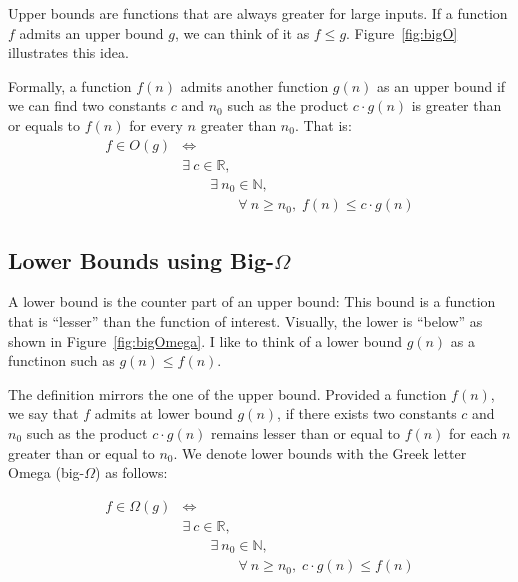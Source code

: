 \documentclass{aldast}
\begin{document}
Upper bounds are functions that are always greater for large
inputs. If a function $f$ admits an upper bound $g$, we can think of
it as $f \leq g$. Figure~\ref{fig:bigO} illustrates this idea.

Formally, a function $f(n)$ admits another function $g(n)$ as an upper
bound if we can find two constants $c$ and $n_0$ such as the product
$c \cdot g(n)$ is greater than or equals to $f(n)$ for every $n$
greater than $n_0$. That is:
\begin{equation*}
  \begin{split}
  f \in O (g) & \iff \\
  & \exists \: c \in \mathbb{R}, \; \\
  & \qquad \exists \: n_0 \in \mathbb{N}, \;  \\
  & \qquad \qquad \forall \: n \geq n_0,\; f(n) \leq c \cdot g(n) 
  \end{split}
\end{equation*}

\subsection{Lower Bounds using Big-$\Omega$}

A lower bound is the counter part of an upper bound: This
bound is a function that is ``lesser'' than the function of
interest. Visually, the lower is ``below'' as shown in
Figure~\ref{fig:bigOmega}. I like to think of a lower bound $g(n)$ as
a functinon such as $g(n) \leq f(n)$.


The definition mirrors the one of the upper bound. Provided a function
$f(n)$, we say that $f$ admits at lower bound $g(n)$, if there exists
two constants $c$ and $n_0$ such as the product $c \cdot g(n)$ remains
lesser than or equal to $f(n)$ for each $n$ greater than or equal to
$n_0$. We denote lower bounds with the Greek letter Omega
(big-$\Omega$) as follows:

\begin{equation*}
  \begin{split}
  f \in \Omega (g) & \iff \\
  & \exists \: c \in \mathbb{R}, \; \\
  & \qquad \exists \: n_0 \in \mathbb{N}, \;  \\
  & \qquad \qquad \forall \: n \geq n_0,\; c \cdot g(n) \leq f(n) 
  \end{split}
\end{equation*}
\end{document}
